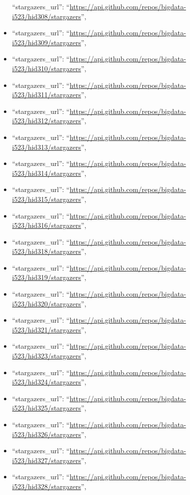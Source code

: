 \begin{itemize}
  ``stargazers\_url'':
  ``\url{https://api.github.com/repos/bigdata-i523/hid308/stargazers}'',
\item
  ``stargazers\_url'':
  ``\url{https://api.github.com/repos/bigdata-i523/hid309/stargazers}'',
\item
  ``stargazers\_url'':
  ``\url{https://api.github.com/repos/bigdata-i523/hid310/stargazers}'',
\item
  ``stargazers\_url'':
  ``\url{https://api.github.com/repos/bigdata-i523/hid311/stargazers}'',
\item
  ``stargazers\_url'':
  ``\url{https://api.github.com/repos/bigdata-i523/hid312/stargazers}'',
\item
  ``stargazers\_url'':
  ``\url{https://api.github.com/repos/bigdata-i523/hid313/stargazers}'',
\item
  ``stargazers\_url'':
  ``\url{https://api.github.com/repos/bigdata-i523/hid314/stargazers}'',
\item
  ``stargazers\_url'':
  ``\url{https://api.github.com/repos/bigdata-i523/hid315/stargazers}'',
\item
  ``stargazers\_url'':
  ``\url{https://api.github.com/repos/bigdata-i523/hid316/stargazers}'',
\item
  ``stargazers\_url'':
  ``\url{https://api.github.com/repos/bigdata-i523/hid318/stargazers}'',
\item
  ``stargazers\_url'':
  ``\url{https://api.github.com/repos/bigdata-i523/hid319/stargazers}'',
\item
  ``stargazers\_url'':
  ``\url{https://api.github.com/repos/bigdata-i523/hid320/stargazers}'',
\item
  ``stargazers\_url'':
  ``\url{https://api.github.com/repos/bigdata-i523/hid321/stargazers}'',
\item
  ``stargazers\_url'':
  ``\url{https://api.github.com/repos/bigdata-i523/hid323/stargazers}'',
\item
  ``stargazers\_url'':
  ``\url{https://api.github.com/repos/bigdata-i523/hid324/stargazers}'',
\item
  ``stargazers\_url'':
  ``\url{https://api.github.com/repos/bigdata-i523/hid325/stargazers}'',
\item
  ``stargazers\_url'':
  ``\url{https://api.github.com/repos/bigdata-i523/hid326/stargazers}'',
\item
  ``stargazers\_url'':
  ``\url{https://api.github.com/repos/bigdata-i523/hid327/stargazers}'',
\item
  ``stargazers\_url'':
  ``\url{https://api.github.com/repos/bigdata-i523/hid328/stargazers}'',

\end{itemize}

